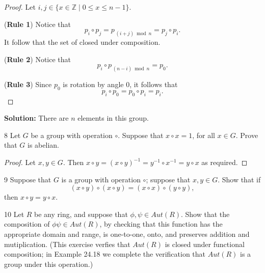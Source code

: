 \begin{proof}
Let $i, j \in \{x \in \mathbb{Z} \mid 0 \le x \le n-1\}$.

(\textbf{Rule 1})
    Notice that
    \[
    p_i \circ p_j = p_{\, (i+j)\bmod n} = p_j \circ p_i.
    \]
    It follow that the set of closed under composition.

    (\textbf{Rule 2})
    Notice that
    \[
    p_i \circ p_{\, (n-i)\bmod n} = p_0.
    \]

    (\textbf{Rule 3})
    Since $p_0$ is rotation by angle $0$, it follows that
    \[
    p_i \circ p_0 = p_0 \circ p_i = p_i.
    \]
\end{proof}

\textbf{Solution:} There are $n$ elements in this group.

\begin{problem}{8}
    Let $G$ be a group with operation $\circ$.
    Suppose that $x \circ x = 1$, for all $x \in G$.
    Prove that $G$ is abelian.
\end{problem}
\solved

\begin{proof}
    Let $x, y \in G$.
    Then $x \circ y = (x \circ y)^{-1} = y^{-1} \circ x^{-1} = y \circ x$ as required.
\end{proof}

\begin{problem}{9}
    Suppose that $G$ is a group with operation $\circ$; suppose that $x, y \in G$. Show
    that if
    \[(x \circ y) \circ (x \circ y) = (x \circ x) \circ (y \circ y),\]
    then $x \circ y = y \circ x$.
\end{problem}
\unsolved

\begin{problem}{10}
    Let $R$ be any ring, and suppose that $\phi, \psi \in Aut(R)$.
    Show that the composition of $\phi \psi \in Aut(R)$, by checking 
    that this function has the appropriate domain and range, is one-to-one,
    onto, and preserves addition and mutiplication. (This exercise 
    verfies that $Aut(R)$ is closed under functional composition; in 
    Example 24.18 we complete the verification that $Aut(R)$ is a group under this 
    operation.)
\end{problem}
\solved


